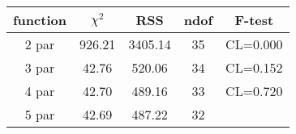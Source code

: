 \begin{tabular}{c|c|c|c|c}
function & $\chi^2$ & RSS & ndof & F-test \\
\hline
2 par & 926.21 & 3405.14 & 35 & CL=0.000 \\
3 par & 42.76 & 520.06 & 34 & CL=0.152 \\
4 par & 42.70 & 489.16 & 33 & CL=0.720 \\
5 par & 42.69 & 487.22 & 32 & \\
\hline
\end{tabular}